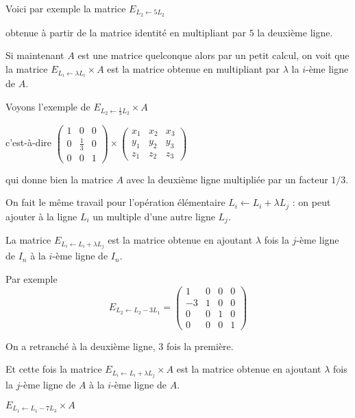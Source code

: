 \change
Voici par exemple la matrice $ E_{L_2 \leftarrow 5 L_2}$

obtenue à partir de la matrice identité en multipliant par $5$ la deuxième ligne.


\change
Si maintenant $A$ est une matrice quelconque
alors par un petit calcul, on voit que la matrice 
$E_{L_i \leftarrow \lambda L_i} \times A$ 
est la matrice obtenue en multipliant par $\lambda$ la $i$-ème ligne de $A$.


\change
Voyons l'exemple de $E_{L_2 \leftarrow \frac13 L_2}  \times A$

\change
c'est-à-dire $ \begin{pmatrix}
  1&0&0\\0&\frac13&0\\0&0&1  
  \end{pmatrix}
  \times
  \begin{pmatrix}
  x_1&x_2&x_3\\y_1&y_2&y_3\\z_1&z_2&z_3  
  \end{pmatrix}$

\change
qui donne bien la matrice $A$ avec la deuxième ligne multipliée par un facteur $1/3$.
  

\diapo

On fait le même travail pour l'opération élémentaire 
$L_i \leftarrow L_i+\lambda L_j$  :
  on peut ajouter à la ligne $L_i$ un multiple d'une autre ligne $L_j$.

\change
La matrice $E_{L_i \leftarrow L_i+\lambda L_j}$ est la  matrice
obtenue en ajoutant $\lambda$ fois la $j$-ème ligne de $I_n$ à la $i$-ème ligne de $I_n$.

\change
Par exemple 
 $$  E_{L_2 \leftarrow L_2 -3 L_1}=
    \begin{pmatrix}
    1 & 0 & 0 & 0\\
    -3 & 1 & 0 & 0\\
    0 & 0 & 1 & 0\\
    0 & 0 & 0 & 1
    \end{pmatrix}$$
 
 On a retranché à la deuxième ligne, $3$ fois la première.
 
 
\change
Et cette fois la matrice $E_{L_i \leftarrow L_i+\lambda L_j} \times A$ est la  matrice obtenue 
en ajoutant $\lambda$ fois la $j$-ème ligne de $A$ à la $i$-ème ligne de $A$.

\change
$E_{L_1 \leftarrow L_1-7 L_3}  \times A$

